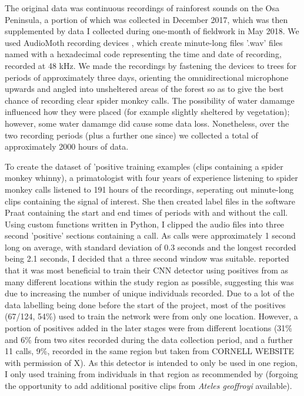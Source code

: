 \documentclass[11pt]{article}
\begin{document}
The original data was continuous recordings of rainforest sounds on the Osa Peninsula, a portion of which was collected in December 2017, which was then supplemented by data I collected during one-month of fieldwork in May 2018. We used AudioMoth recording devices \citep{hill2018audiomoth}, which create minute-long files '.wav' files named with a hexadecimal code representing the time and date of recording, recorded at 48 kHz. We made the recordings by fastening the devices to trees for periods of approximately three days, orienting the omnidirectional microphone upwards and angled into unsheltered areas of the forest so as to give the best chance of recording clear spider monkey calls. The possibility of water damamge influenced how they were placed (for example slightly sheltered by vegetation); however, some water damamge did cause some data loss. Nonetheless, over the two recording periods (plus a further one since) we collected a total of approximately 2000 hours of data.

To create the dataset of 'positive training examples (clips containing a spider monkey whinny), a primatologist with four years of experience listening to spider monkey calls listened to 191 hours of the recordings, seperating out minute-long clips containing the signal of interest. She then created label files in the software Praat \citep{praat} containing the start and end times of periods with and without the call. Using custom functions written in Python, I clipped the audio files into three second 'positive' sections containing a call. As calls were approximately 1 second long on average, with standard deviation of 0.3 seconds and the longest recorded being 2.1 seconds, I decided that a three second window was suitable. \cite{crump2017designing} reported that it was most beneficial to train their CNN detector using positives from as many different locations within the study region as possible, suggesting this was due to increasing the number of unique individuals recorded. Due to a lot of the data labelling being done before the start of the project, most of the positives (67/124, 54\%) used to train the network were from only one location. However, a portion of positives added in the later stages were from different locations (31\% and 6\% from two sites recorded during the data collection period, and a further 11 calls, 9\%, recorded in the same region but taken from CORNELL WEBSITE with permission of X). As this detector is intended to only be used in one region, I only used training from individuals in that region as recommended by \cite{knight2017recommendations} (forgoing the opportunity to add additional positive clips from \textit{Ateles geoffroyi} available).
\end{document}
